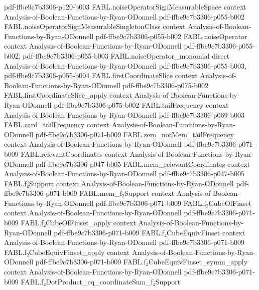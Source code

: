 \begin{theorem}
  {pdf-ffbe9c7b3306-p120-b003}
\proofstep
  {FABL.noiseOperatorSignMeasurableSpace}
  {context}
  {Analysis-of-Boolean-Functions-by-Ryan-ODonnell}
  {pdf-ffbe9c7b3306-p055-b002}
\proofstep
  {FABL.noiseOperatorSignMeasurableSingletonClass}
  {context}
  {Analysis-of-Boolean-Functions-by-Ryan-ODonnell}
  {pdf-ffbe9c7b3306-p055-b002}
\proofstep
  {FABL.noiseOperator}
  {context}
  {Analysis-of-Boolean-Functions-by-Ryan-ODonnell}
  {pdf-ffbe9c7b3306-p055-b002,
    pdf-ffbe9c7b3306-p055-b003}
\proofstep
  {FABL.noiseOperator_monomial}
  {direct}
  {Analysis-of-Boolean-Functions-by-Ryan-ODonnell}
  {pdf-ffbe9c7b3306-p055-b003,
    pdf-ffbe9c7b3306-p055-b004}
\proofstep
  {FABL.firstCoordinateSlice}
  {context}
  {Analysis-of-Boolean-Functions-by-Ryan-ODonnell}
  {pdf-ffbe9c7b3306-p075-b002}
\proofstep
  {FABL.firstCoordinateSlice_apply}
  {context}
  {Analysis-of-Boolean-Functions-by-Ryan-ODonnell}
  {pdf-ffbe9c7b3306-p075-b002}
\proofstep
  {FABL.tailFrequency}
  {context}
  {Analysis-of-Boolean-Functions-by-Ryan-ODonnell}
  {pdf-ffbe9c7b3306-p069-b003}
\proofstep
  {FABL.card_tailFrequency}
  {context}
  {Analysis-of-Boolean-Functions-by-Ryan-ODonnell}
  {pdf-ffbe9c7b3306-p071-b009}
\proofstep
  {FABL.zero_notMem_tailFrequency}
  {context}
  {Analysis-of-Boolean-Functions-by-Ryan-ODonnell}
  {pdf-ffbe9c7b3306-p071-b009}
\proofstep
  {FABL.relevantCoordinates}
  {context}
  {Analysis-of-Boolean-Functions-by-Ryan-ODonnell}
  {pdf-ffbe9c7b3306-p047-b005}
\proofstep
  {FABL.mem_relevantCoordinates}
  {context}
  {Analysis-of-Boolean-Functions-by-Ryan-ODonnell}
  {pdf-ffbe9c7b3306-p047-b005}
\proofstep
  {FABL.f₂Support}
  {context}
  {Analysis-of-Boolean-Functions-by-Ryan-ODonnell}
  {pdf-ffbe9c7b3306-p071-b009}
\proofstep
  {FABL.mem_f₂Support}
  {context}
  {Analysis-of-Boolean-Functions-by-Ryan-ODonnell}
  {pdf-ffbe9c7b3306-p071-b009}
\proofstep
  {FABL.f₂CubeOfFinset}
  {context}
  {Analysis-of-Boolean-Functions-by-Ryan-ODonnell}
  {pdf-ffbe9c7b3306-p071-b009}
\proofstep
  {FABL.f₂CubeOfFinset_apply}
  {context}
  {Analysis-of-Boolean-Functions-by-Ryan-ODonnell}
  {pdf-ffbe9c7b3306-p071-b009}
\proofstep
  {FABL.f₂CubeEquivFinset}
  {context}
  {Analysis-of-Boolean-Functions-by-Ryan-ODonnell}
  {pdf-ffbe9c7b3306-p071-b009}
\proofstep
  {FABL.f₂CubeEquivFinset_apply}
  {context}
  {Analysis-of-Boolean-Functions-by-Ryan-ODonnell}
  {pdf-ffbe9c7b3306-p071-b009}
\proofstep
  {FABL.f₂CubeEquivFinset_symm_apply}
  {context}
  {Analysis-of-Boolean-Functions-by-Ryan-ODonnell}
  {pdf-ffbe9c7b3306-p071-b009}
\proofstep
  {FABL.f₂DotProduct_eq_coordinateSum_f₂Support}

\end{theorem}
